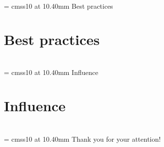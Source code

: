 \documentclass{beamer}
\begin{document}
{
\section*{}
	\begin{frame}
      \begin{center}
        \font\endfont = cmss10 at 10.40mm
        \color{darkBlue}
        \endfont 
        \baselineskip 20.0mm   
        Best practices
      \end{center}    
\end{frame}
}

\section{Best practices}

{
\section*{}
	\begin{frame}
      \begin{center}
        \font\endfont = cmss10 at 10.40mm
        \color{darkBlue}
        \endfont 
        \baselineskip 20.0mm   
        Influence
      \end{center}    
\end{frame}
}

\section{Influence}

{
\section*{}
	\begin{frame}
      \begin{center}
        \font\endfont = cmss10 at 10.40mm
        \color{darkBlue}
        \endfont 
        \baselineskip 20.0mm
        Thank you for your attention!
      \end{center}    
\end{frame}
}
\end{document}

